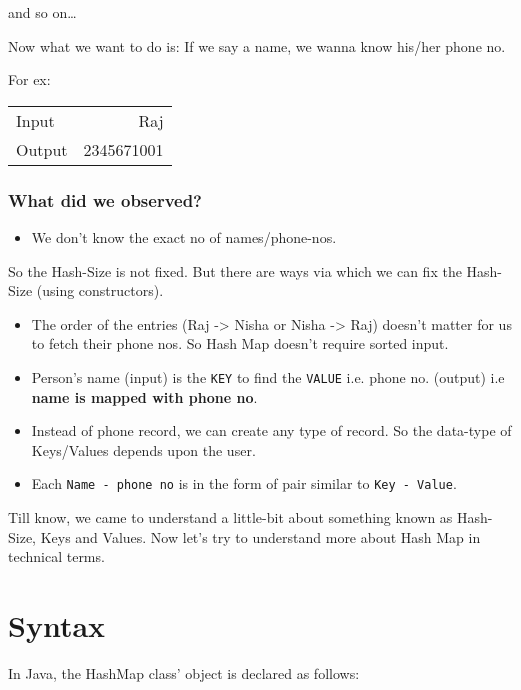 \documentclass[11pt]{article}
\begin{document}
and so on…

Now what we want to do is:
If we say a name, we wanna know his/her phone no.

For ex:

\begin{center}
\begin{tabular}{lr}
Input & Raj\\
Output & 2345671001\\
\end{tabular}
\end{center}

\subsubsection{What did we observed?}
\label{sec:orge7b120c}

\begin{itemize}
\item We don’t know the exact no of names/phone-nos.
\end{itemize}

So the Hash-Size is not fixed. But there are ways via which we can fix the
Hash-Size (using constructors).

\begin{itemize}
\item The order of the entries (Raj -> Nisha or Nisha -> Raj) doesn’t matter for us
to fetch their phone nos. So Hash Map doesn’t require sorted input.
\item Person’s name (input) is the \texttt{KEY} to find the \texttt{VALUE} i.e. phone no. (output)
i.e \textbf{name is mapped with phone no}.
\item Instead of phone record, we can create any type of record. So the data-type of
Keys/Values depends upon the user.
\item Each \texttt{Name - phone no} is in the form of pair similar to \texttt{Key - Value}.
\end{itemize}

Till know, we came to understand a little-bit about something known as
Hash-Size, Keys and Values. Now let’s try to understand more about Hash Map in
technical terms.

\section{Syntax}
\label{sec:org0d79f9e}

In Java, the HashMap class’ object is declared as follows:
\end{document}

